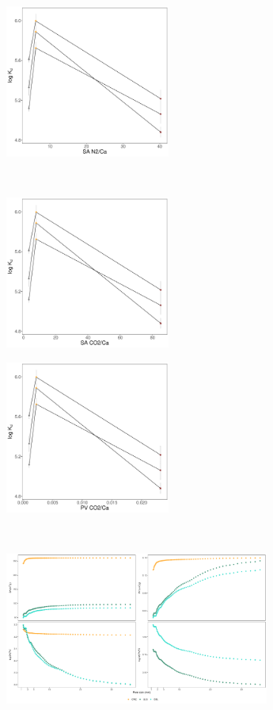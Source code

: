 \begin{figure}[t!]
\begin{subfigure}[t]{0.5\textwidth}
        \caption{}
        \label{subfig:PVCO2}
    \end{subfigure}
    \medskip
    \begin{subfigure}[t]{0.5\textwidth}
        \centering
        \includegraphics[height=5cm]{R/figs/Kd_1ugL_SAN2_Ca.pdf}
        \caption{}
        \label{subfig:SAN2_Ca}
    \end{subfigure}%
    ~ 
    \begin{subfigure}[t]{0.5\textwidth}
        \centering
        \includegraphics[height=5cm]{R/figs/Kd_1ugL_SACO2_Ca.pdf}
        \caption{}
        \label{subfig:SACO2_Ca}
    \end{subfigure}
    \medskip
    \begin{subfigure}[t]{0.5\textwidth}
        \centering
        \includegraphics[height=5cm]{R/figs/Kd_1ugL_PVCO2_Ca.pdf}
        \caption{}
        \label{subfig:PVCO2_Ca}
    \end{subfigure}%
    ~ 
    \begin{subfigure}[t]{0.5\textwidth}
        \centering
        \includegraphics[height=5cm]{R/figs/Kd_1ugL_PVN2_Ca.pdf}
        \caption{}
        \label{subfig:PVN2_Ca}
    \end{subfigure}
\end{figure}
